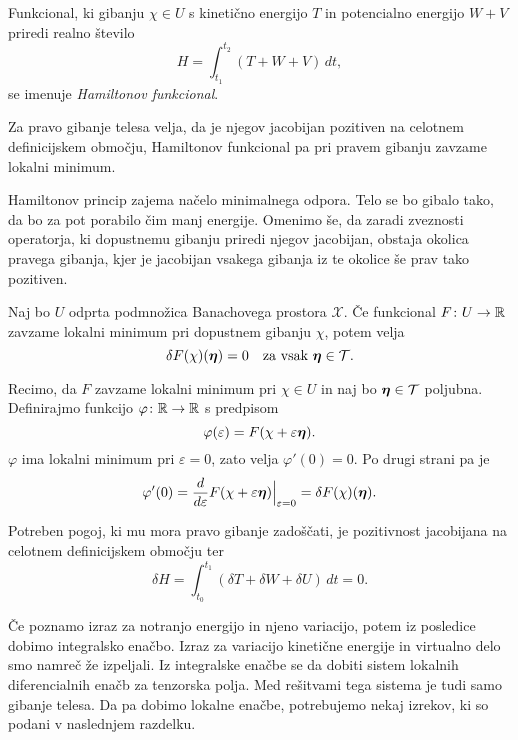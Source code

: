 \begin{definicija}
	Funkcional, ki gibanju $\chi\in U$ s kinetično energijo $T$ in potencialno
	energijo $W+V$ priredi realno število
	\[
		H=\int_{t_1}^{t_2}(T+W+V)\,dt,
	\]
	se imenuje \emph{Hamiltonov funkcional}.
\end{definicija}

\begin{aksiom}
	Za pravo gibanje telesa velja, da je njegov jacobijan pozitiven na
	celotnem definicijskem območju, Hamiltonov funkcional pa pri pravem gibanju
	zavzame lokalni minimum.
\end{aksiom}

Hamiltonov princip zajema načelo minimalnega odpora. Telo se bo gibalo tako, da
bo za pot porabilo čim manj energije. Omenimo še, da zaradi zveznosti operatorja,
ki dopustnemu gibanju priredi njegov jacobijan, obstaja okolica pravega gibanja,
kjer je jacobijan vsakega gibanja iz te okolice še prav tako pozitiven.

\begin{trditev}
	Naj bo $U$ odprta podmnožica Banachovega prostora $\mathcal{X}$.
	Če funkcional $F\colon U\to\mathbb R$ zavzame lokalni minimum pri dopustnem gibanju $\chi$, potem velja
	\[ \delta F(\chi)(\vek{\eta})=0\quad\textrm{za vsak}\ \vek{\eta}\in\mathcal{T}. \]
\end{trditev}

\proof
	Recimo, da $F$ zavzame lokalni minimum pri $\chi\in U$ in naj bo $\boldsymbol \eta\in\mathcal{T}$ poljubna.
	Definirajmo funkcijo $\varphi\colon\mathbb R\to\mathbb R$ s predpisom
	\[ \varphi(\varepsilon)=F(\chi+\varepsilon\boldsymbol \eta). \]
	$\varphi$ ima lokalni minimum pri $\varepsilon=0$, zato velja $\varphi'(0)=0.$
	Po drugi strani pa je
	\[
		\varphi'(0)=\frac{d}{d\varepsilon}F(\chi+\varepsilon\boldsymbol \eta)\Big|_{\varepsilon=0}=
		\delta F(\chi)(\boldsymbol \eta).
	\]
\endproof

\begin{posledica} \label{p:varham0}
	Potreben pogoj, ki mu mora pravo gibanje zadoščati, je pozitivnost jacobijana
	na celotnem definicijskem območju ter
	\[ \delta H = \int_{t_0}^{t_1}(\delta T+\delta W+\delta U)\,dt = 0. \]
\end{posledica}

Če poznamo izraz za notranjo energijo in njeno variacijo, potem iz posledice
dobimo integralsko enačbo. Izraz za variacijo kinetične energije in virtualno delo 
smo namreč že izpeljali. Iz integralske enačbe se da dobiti sistem lokalnih diferencialnih enačb
za tenzorska polja. Med rešitvami tega sistema je tudi samo gibanje telesa.
Da pa dobimo lokalne enačbe, potrebujemo nekaj izrekov, ki so podani v naslednjem razdelku.


